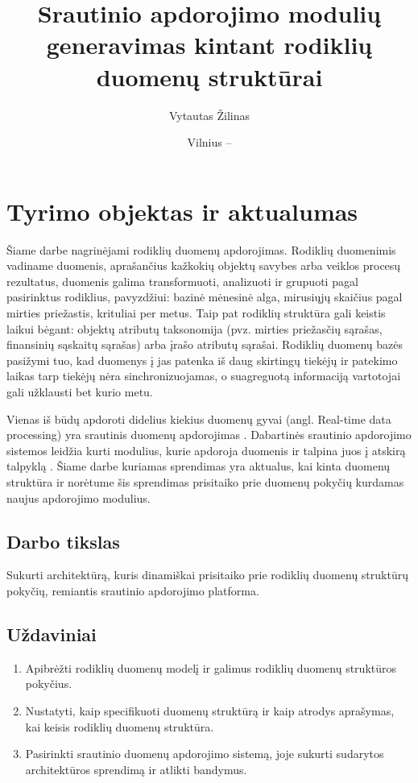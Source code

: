 \documentclass{VUMIFPSbakalaurinis}
\title{Srautinio apdorojimo modulių generavimas kintant rodiklių duomenų struktūrai}
\author{Vytautas Žilinas}
\date{Vilnius – \the\year}
\begin{document}
 
\maketitle

\cleardoublepage{}
\setcounter{page}{2}

\section{Tyrimo objektas ir aktualumas}
Šiame darbe nagrinėjami rodiklių duomenų apdorojimas. Rodiklių duomenimis vadiname duomenis, aprašančius kažkokių objektų savybes arba veiklos procesų rezultatus, 
duomenis galima transformuoti, analizuoti ir grupuoti pagal pasirinktus rodiklius, 
pavyzdžiui: bazinė mėnesinė alga, mirusiųjų skaičius pagal mirties priežastis, krituliai per metus. Taip pat rodiklių struktūra gali keistis laikui bėgant: 
objektų atributų taksonomija (pvz. mirties priežasčių sąrašas, finansinių sąskaitų sąrašas) arba įrašo atributų sąrašai.
Rodiklių duomenų bazės pasižymi tuo, kad duomenys į jas patenka iš daug skirtingų tiekėjų ir patekimo laikas tarp tiekėjų nėra 
sinchronizuojamas, o suagreguotą informaciją vartotojai gali užklausti bet kurio metu.  \par
Vienas iš būdų apdoroti didelius kiekius duomenų gyvai (angl. Real-time data processing) yra srautinis duomenų apdorojimas \cite{BigData, StreamProcessingInData}. 
Dabartinės srautinio apdorojimo sistemos leidžia kurti modulius, kurie apdoroja duomenis ir talpina juos į atskirą talpyklą \cite{8Requirements}. 
Šiame darbe kuriamas sprendimas yra aktualus, kai kinta duomenų struktūra ir norėtume šis sprendimas prisitaiko 
prie duomenų pokyčių kurdamas naujus apdorojimo modulius.

\subsection{Darbo tikslas}
Sukurti architektūrą, kuris dinamiškai prisitaiko prie rodiklių duomenų struktūrų pokyčių, remiantis srautinio apdorojimo platforma.

\subsection{Uždaviniai}
\begin{enumerate}
    \item Apibrėžti rodiklių duomenų modelį ir galimus rodiklių duomenų struktūros pokyčius.
    \item Nustatyti, kaip specifikuoti duomenų struktūrą ir kaip atrodys aprašymas, kai keisis rodiklių duomenų struktūra.
    \item Pasirinkti srautinio duomenų apdorojimo sistemą, joje sukurti sudarytos architektūros sprendimą ir atlikti bandymus.
\end{enumerate}
\end{document}
